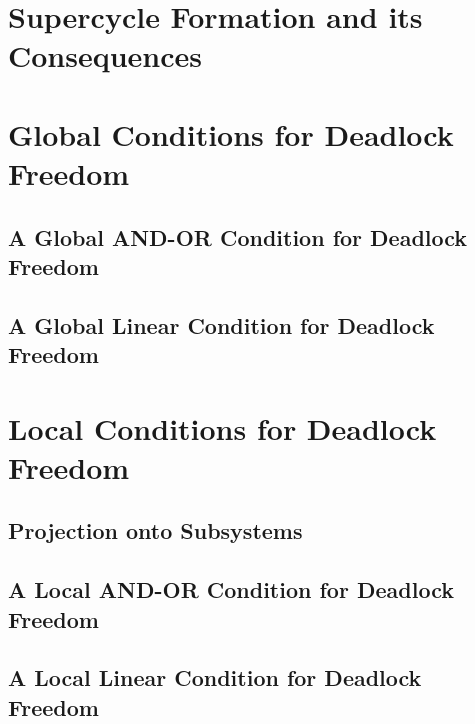 \documentclass[prodmode,acmtosem]{acmsmall} %
\begin{document}
\section{Supercycle Formation and its Consequences}
\label{secn:scFormation}



\section{Global Conditions for Deadlock Freedom}
\label{s:global}

   \subsection{A Global AND-OR Condition for Deadlock Freedom}
   \label{s:global.ANDOR}
   

   \subsection{A Global Linear Condition for Deadlock Freedom}
   \label{s:globCondition}
   \label{s:global.Linear}
   


\section{Local Conditions for Deadlock Freedom}
\label{s:local}

   \label{s:local.preamble}
   

   \subsection{Projection onto Subsystems}
   \label{s:projection}
   

   \subsection{A Local AND-OR Condition for Deadlock Freedom}
   \label{s:ANDORcond}
   

   \subsection{A Local Linear Condition for Deadlock Freedom}
   \label{s:condition}
   
\end{document}
